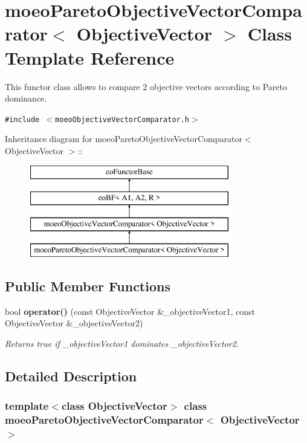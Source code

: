 \section{moeo\-Pareto\-Objective\-Vector\-Comparator$<$ Objective\-Vector $>$ Class Template Reference}
\label{classmoeoParetoObjectiveVectorComparator}
This functor class allows to compare 2 objective vectors according to Pareto dominance.  


{\tt \#include $<$moeo\-Objective\-Vector\-Comparator.h$>$}

Inheritance diagram for moeo\-Pareto\-Objective\-Vector\-Comparator$<$ Objective\-Vector $>$::\begin{figure}[H]
\begin{center}
\leavevmode
\includegraphics[height=4cm]{classmoeoParetoObjectiveVectorComparator}
\end{center}
\end{figure}
\subsection*{Public Member Functions}
\begin{CompactItemize}
\item 
bool {\bf operator()} (const Objective\-Vector \&\_\-objective\-Vector1, const Objective\-Vector \&\_\-objective\-Vector2)
\begin{CompactList}\small\item\em Returns true if \_\-objective\-Vector1 dominates \_\-objective\-Vector2. \item\end{CompactList}\end{CompactItemize}


\subsection{Detailed Description}
\subsubsection*{template$<$class Objective\-Vector$>$ class moeo\-Pareto\-Objective\-Vector\-Comparator$<$ Objective\-Vector $>$}

